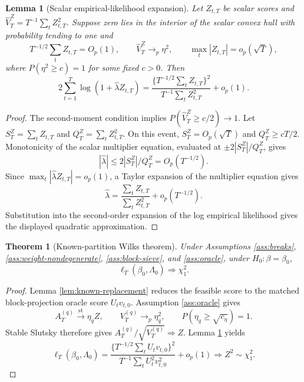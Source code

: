 \documentclass[12pt]{article}
\numberwithin{equation}{section}
\newtheorem{theorem}{Theorem}
\newtheorem{lemma}{Lemma}
\theoremstyle{definition}
\begin{document}
\begin{lemma}[Scalar empirical-likelihood expansion]
\label{lem:el-expansion}
Let \(Z_{t,T}\) be scalar scores and \(\widehat V_T^Z=T^{-1}\sum_tZ_{t,T}^2\). Suppose zero lies in the interior of the scalar convex hull with probability tending to one and
\[
    T^{-1/2}\sum_t Z_{t,T}=O_p(1),
    \qquad
    \widehat V_T^Z\to_p\eta^2,
    \qquad
    \max_t|Z_{t,T}|=o_p(\sqrt T),
\]
where \(P(\eta^2\geq c)=1\) for some fixed \(c>0\). Then
\[
    2\sum_{t=1}^T\log(1+\widehat\lambda Z_{t,T})
    =
    \frac{\{T^{-1/2}\sum_tZ_{t,T}\}^2}
         {T^{-1}\sum_tZ_{t,T}^2}
    +o_p(1).
\]
\end{lemma}

\begin{proof}
The second-moment condition implies \(P(\widehat V_T^Z\geq c/2)\to1\). Let \(S_T^Z=\sum_tZ_{t,T}\) and \(Q_T^Z=\sum_tZ_{t,T}^2\). On this event, \(S_T^Z=O_p(\sqrt T)\) and \(Q_T^Z\geq cT/2\). Monotonicity of the scalar multiplier equation, evaluated at \(\pm 2|S_T^Z|/Q_T^Z\), gives
\[
    |\widehat\lambda|
    \leq
    2|S_T^Z|/Q_T^Z
    =O_p(T^{-1/2}).
\]
Since \(\max_t|\widehat\lambda Z_{t,T}|=o_p(1)\), a Taylor expansion of the multiplier equation gives
\[
    \widehat\lambda
    =
    \frac{\sum_t Z_{t,T}}{\sum_t Z_{t,T}^2}
    +o_p(T^{-1/2}).
\]
Substitution into the second-order expansion of the log empirical likelihood gives the displayed quadratic approximation.
\end{proof}

\begin{theorem}[Known-partition Wilks theorem]
\label{thm:known-wilks}
Under Assumptions \ref{ass:breaks}, \ref{ass:weight-nondegenerate}, \ref{ass:block-sieve}, and \ref{ass:oracle}, under \(H_0:\beta=\beta_0\),
\[
    \ell_T(\beta_0,\Lambda_0)\Rightarrow\chi_1^2.
\]
\end{theorem}

\begin{proof}
Lemma \ref{lem:known-replacement} reduces the feasible score to the matched block-projection oracle score \(U_tv_{t,0}\). Assumption \ref{ass:oracle} gives
\[
    A_T^{(q)}\xrightarrow{\mathrm{st}}\eta_qZ,
    \qquad
    V_T^{(q)}\to_p\eta_q^2,
    \qquad
    P(\eta_q\geq\sqrt{c_\eta})=1.
\]
Stable Slutsky therefore gives \(A_T^{(q)}/\sqrt{V_T^{(q)}}\Rightarrow Z\). Lemma \ref{lem:el-expansion} yields
\[
    \ell_T(\beta_0,\Lambda_0)
    =
    \frac{\{T^{-1/2}\sum_tU_tv_{t,0}\}^2}
         {T^{-1}\sum_tU_t^2v_{t,0}^2}
    +o_p(1)
    \Rightarrow Z^2\sim\chi_1^2.
\]
\end{proof}
\end{document}
